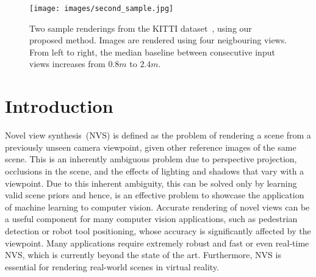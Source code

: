 \documentclass[runningheads]{llncs}
\newcommand{\squeezeup}{\vspace{-5.5mm}}
\begin{document}
\begin{figure}[htb!]
\centering
\texttt{[image: images/second\_sample.jpg]}
\caption{Two sample renderings from the KITTI dataset~\cite{geiger2012we}, using our proposed method. Images are rendered using four neigbouring views. From left to right, the median baseline between consecutive input views increases from $0.8m$ to $2.4m$.}
\label{fig:qualitative}
\end{figure}
\squeezeup
\section{Introduction}

Novel view synthesis~(NVS) is defined as the problem of rendering a scene from a previously unseen camera viewpoint, given other reference images of the same scene. This is an inherently ambiguous problem due to perspective projection, occlusions in the scene, and the effects of lighting and shadows that vary with a viewpoint. Due to this inherent ambiguity, this can be solved only by learning valid scene priors and hence, is an effective problem to showcase the application of machine learning to computer vision. Accurate rendering of novel views can be a useful component for many computer vision applications, such as pedestrian detection or robot tool positioning, whose accuracy is significantly affected by the viewpoint. Many applications require extremely robust and fast or even real-time NVS, which is currently beyond the state of the art. Furthermore, NVS is essential for rendering real-world scenes in virtual reality.
\end{document}
